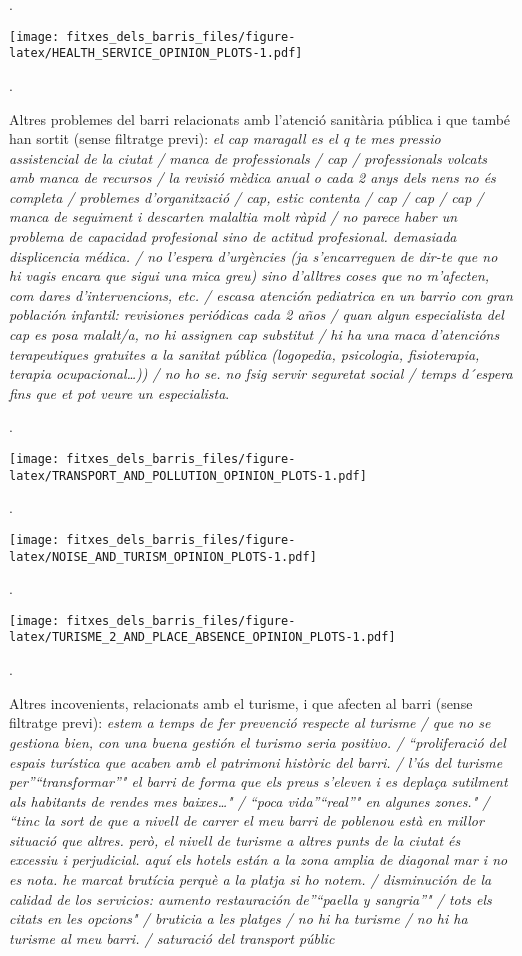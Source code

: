 \documentclass[]{article}
\begin{document}
.

\texttt{[image: fitxes\_dels\_barris\_files/figure-latex/HEALTH\_SERVICE\_OPINION\_PLOTS-1.pdf]}

.

Altres problemes del barri relacionats amb l'atenció sanitària pública i
que també han sortit (sense filtratge previ): \emph{el cap maragall es
el q te mes pressio assistencial de la ciutat / manca de professionals /
cap / professionals volcats amb manca de recursos / la revisió mèdica
anual o cada 2 anys dels nens no és completa / problemes d'organització
/ cap, estic contenta / cap / cap / cap / manca de seguiment i descarten
malaltia molt ràpid / no parece haber un problema de capacidad
profesional sino de actitud profesional. demasiada displicencia médica.
/ no l'espera d'urgències (ja s'encarreguen de dir-te que no hi vagis
encara que sigui una mica greu) sino d'alltres coses que no m'afecten,
com dares d'intervencions, etc. / escasa atención pediatrica en un
barrio con gran población infantil: revisiones periódicas cada 2 años /
quan algun especialista del cap es posa malalt/a, no hi assignen cap
substitut / hi ha una maca d'atencións terapeutiques gratuites a la
sanitat pública (logopedia, psicologia, fisioterapia, terapia
ocupacional\ldots{})) / no ho se. no fsig servir seguretat social /
temps d´espera fins que et pot veure un especialista}.

.

\texttt{[image: fitxes\_dels\_barris\_files/figure-latex/TRANSPORT\_AND\_POLLUTION\_OPINION\_PLOTS-1.pdf]}

.

\texttt{[image: fitxes\_dels\_barris\_files/figure-latex/NOISE\_AND\_TURISM\_OPINION\_PLOTS-1.pdf]}

.

\texttt{[image: fitxes\_dels\_barris\_files/figure-latex/TURISME\_2\_AND\_PLACE\_ABSENCE\_OPINION\_PLOTS-1.pdf]}

.

Altres incovenients, relacionats amb el turisme, i que afecten al barri
(sense filtratge previ): \emph{estem a temps de fer prevenció respecte
al turisme / que no se gestiona bien, con una buena gestión el turismo
seria positivo. / ``proliferació del espais turística que acaben amb el
patrimoni històric del barri. / l'ús del turisme per''``transformar''"
el barri de forma que els preus s'eleven i es deplaça sutilment als
habitants de rendes mes baixes\ldots{}" / ``poca vida''``real''" en
algunes zones." / ``tinc la sort de que a nivell de carrer el meu barri
de poblenou està en millor situació que altres. però, el nivell de
turisme a altres punts de la ciutat és excessiu i perjudicial. aquí els
hotels están a la zona amplia de diagonal mar i no es nota. he marcat
brutícia perquè a la platja si ho notem. / disminución de la calidad de
los servicios: aumento restauración de''``paella y sangria''" / tots els
citats en les opcions" / bruticia a les platges / no hi ha turisme / no
hi ha turisme al meu barri. / saturació del transport públic}
\end{document}
